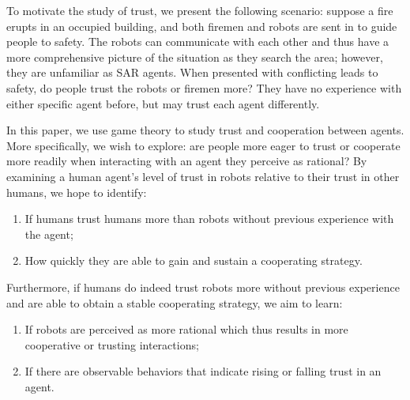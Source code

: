 \documentclass{sig-alternate}
\begin{document}
To motivate the study of trust, we present the following scenario: suppose a fire erupts in an occupied building, and both firemen and robots are sent in to guide people to safety. The robots can communicate with each other and thus have a more comprehensive picture of the situation as they search the area; however, they are unfamiliar as SAR agents. When presented with conflicting leads to safety, do people trust the robots or firemen more? They have no experience with either specific agent before, but may trust each agent differently.

In this paper, we use game theory to study trust and cooperation between agents. More specifically, we wish to explore: are people more eager to trust or cooperate more readily when interacting with an agent they perceive as rational? By examining a human agent's level of trust in robots relative to their trust in other humans, we hope to identify:
\begin{enumerate}
\item If humans trust humans more than robots without previous experience with the agent;
\item How quickly they are able to gain and sustain a cooperating strategy.
\end{enumerate}
Furthermore, if humans do indeed trust robots more without previous experience and are able to obtain a stable cooperating strategy, we aim to learn:
\begin{enumerate}
\item If robots are perceived as more rational which thus results in more cooperative or trusting interactions; 
\item If there are observable behaviors that indicate rising or falling trust in an agent.
\end{enumerate}
 
\end{document}
